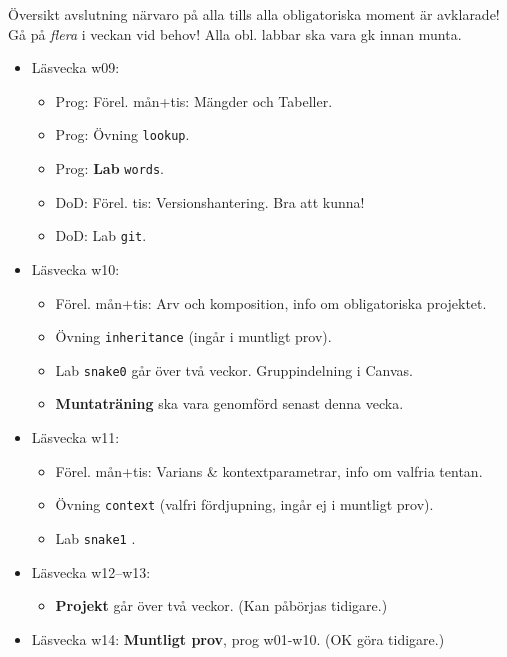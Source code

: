 


\begin{Slide}{Översikt avslutning}\SlideFontTiny
  \vspace{-0.5em}
 närvaro på alla  tills alla obligatoriska moment är avklarade!\\Gå på \emph{flera}  i veckan vid behov! Alla obl. labbar ska vara gk innan munta.
\begin{itemize}
  \item Läsvecka w09: 
\begin{itemize}\SlideFontTiny
  \item Prog: Förel. mån+tis: Mängder och Tabeller.
  \item Prog: Övning \texttt{lookup}.
  \item Prog:  \textbf{Lab} \texttt{words}.
  \item DoD: Förel. tis: Versionshantering. Bra att kunna!
  \item DoD:  Lab \texttt{git}. 
\end{itemize}
  \item Läsvecka w10:
\begin{itemize}\SlideFontTiny
  \item Förel. mån+tis: Arv och komposition, info om obligatoriska projektet.
  \item Övning \texttt{inheritance} (ingår i muntligt prov).
  \item {} Lab \texttt{snake0} går över två veckor. Gruppindelning i Canvas.
  \item {} \textbf{Muntaträning} ska vara genomförd senast denna vecka.
\end{itemize}
  \item Läsvecka w11:
\begin{itemize}\SlideFontTiny
  \item Förel. mån+tis: Varians \& kontextparametrar, info om valfria tentan.
  \item Övning \texttt{context} (valfri fördjupning, ingår ej i muntligt prov).
  \item {} Lab \texttt{snake1}  .
\end{itemize}
  \item Läsvecka w12--w13: 
\begin{itemize}\SlideFontTiny
  \item {} \textbf{Projekt} går över två veckor. (Kan påbörjas tidigare.)
\end{itemize}
  \item Läsvecka w14:  \textbf{Muntligt prov}, prog w01-w10. (OK göra tidigare.)
\end{itemize}
\end{Slide}

